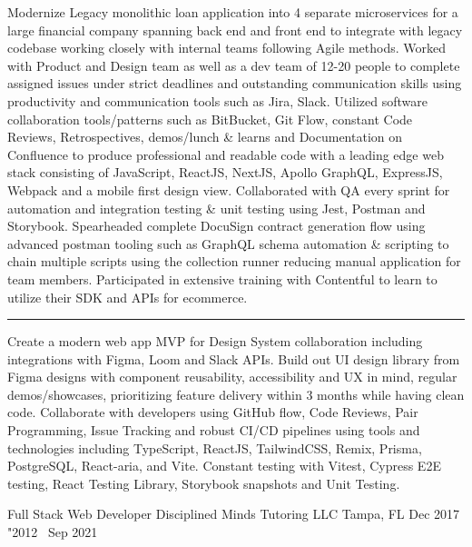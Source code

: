\documentclass{resume}
\begin{document}
\begin{itemize}
\li Modernize Legacy monolithic loan application into 4 separate microservices for a large financial company spanning back end and front end to integrate with legacy codebase working closely with internal teams following Agile methods.
\li Worked with Product and Design team as well as a dev team of 12-20 people to complete assigned issues under strict deadlines and outstanding communication skills using productivity and communication tools such as Jira, Slack.
\li Utilized software collaboration tools/patterns such as BitBucket, Git Flow, constant Code Reviews, Retrospectives, demos/lunch \& learns  and Documentation on Confluence to produce professional and readable code with a leading edge web stack consisting of JavaScript, ReactJS, NextJS, Apollo GraphQL, ExpressJS, Webpack and a mobile first design view.
\li Collaborated with QA every sprint for automation and integration testing \& unit testing using Jest, Postman and Storybook.
\li Spearheaded complete DocuSign contract generation flow using advanced postman tooling such as GraphQL schema automation \& scripting to chain multiple scripts using the collection runner reducing manual application for team members.
\li Participated in extensive training with Contentful to learn to utilize their SDK and APIs for ecommerce.

\vspace{4pt} {\color{dividercolor}\hrule} \vspace{4pt}

\li Create a modern web app MVP for Design System collaboration including integrations with Figma, Loom and Slack APIs.
\li Build out UI design library from Figma designs with component reusability, accessibility and UX in mind, regular demos/showcases, prioritizing feature delivery within 3 months while having clean code.
\li Collaborate with developers using GitHub flow, Code Reviews, Pair Programming, Issue Tracking and robust CI/CD pipelines using tools and technologies including TypeScript, ReactJS, TailwindCSS, Remix, Prisma, PostgreSQL, React-aria, and Vite.
\li Constant testing with Vitest, Cypress E2E testing, React Testing Library, Storybook snapshots and Unit Testing.
\end{itemize}

\vspace{4pt}

\jobInfoLocationDate
  {Full Stack Web Developer}
  {Disciplined Minds Tutoring LLC}
  {Tampa, FL}
  {Dec 2017 \char"2012  \ Sep 2021}
\end{document}
